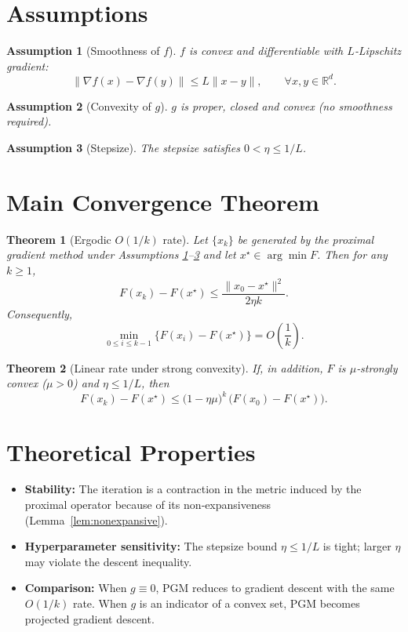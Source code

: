 \documentclass{article}
\newtheorem{theorem}{Theorem}
\newtheorem{assumption}{Assumption}
\begin{document}
\newpage

\section*{Assumptions}
\begin{assumption}[Smoothness of $f$]\label{ass:smooth}
$f$ is convex and differentiable with $L$‑Lipschitz gradient:
\[
\|\nabla f(x)-\nabla f(y)\|\le L\|x-y\|,\qquad\forall x,y\in\mathbb{R}^{d}.
\]
\end{assumption}
\begin{assumption}[Convexity of $g$]\label{ass:convex}
$g$ is proper, closed and convex (no smoothness required).
\end{assumption}
\begin{assumption}[Stepsize]\label{ass:stepsize}
The stepsize satisfies $0<\eta\le 1/L$.
\end{assumption}

\section*{Main Convergence Theorem}
\begin{theorem}[Ergodic $O(1/k)$ rate]\label{thm:conv}
Let $\{x_{k}\}$ be generated by the proximal gradient method under Assumptions \ref{ass:smooth}--\ref{ass:stepsize} and let $x^{\star}\in\arg\min F$. Then for any $k\ge1$,
\[
F(x_{k})-F(x^{\star})\le\frac{\|x_{0}-x^{\star}\|^{2}}{2\eta k}.
\]
Consequently,
\[
\min_{0\le i\le k-1}\bigl\{F(x_{i})-F(x^{\star})\bigr\}=O\!\left(\frac{1}{k}\right).
\]
\end{theorem}
\begin{theorem}[Linear rate under strong convexity]\label{thm:strong}
If, in addition, $F$ is $\mu$‑strongly convex ($\mu>0$) and $\eta\le 1/L$, then
\[
F(x_{k})-F(x^{\star})\le \bigl(1-\eta\mu\bigr)^{k}\,\bigl(F(x_{0})-F(x^{\star})\bigr).
\]
\end{theorem}

\section*{Theoretical Properties}
\begin{itemize}
\item \textbf{Stability:} The iteration is a contraction in the metric induced by the proximal operator because of its non‑expansiveness (Lemma~\ref{lem:nonexpansive}).
\item \textbf{Hyperparameter sensitivity:} The stepsize bound $\eta\le 1/L$ is tight; larger $\eta$ may violate the descent inequality.
\item \textbf{Comparison:} When $g\equiv0$, PGM reduces to gradient descent with the same $O(1/k)$ rate. When $g$ is an indicator of a convex set, PGM becomes projected gradient descent.
\end{itemize}
\end{document}
